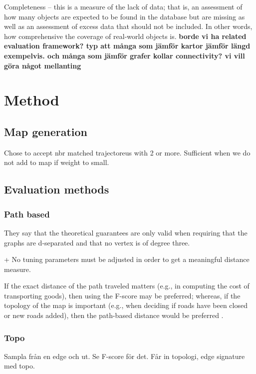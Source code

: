 Completeness – this is a measure of the lack of data; that is, an assessment of how many objects are expected to be found in the database but are missing as well as an assessment of excess data that should not be included. In other words, how comprehensive the coverage of real-world objects is. \citep{haklay}
\textbf{borde vi ha related evaluation framework? typ att många som jämför kartor jämför längd exempelvis. och många som jämför grafer kollar connectivity? vi vill göra något mellanting}



\section{Method}

\subsection{Map generation}

Chose to accept nbr matched trajectoreus with 2 or more. Sufficient when we do not add to map if weight to small. 


\subsection{Evaluation methods}

\subsubsection{Path based}

They say that the theoretical guarantees are only valid when requiring that the graphs are d-separated and that no vertex is of degree three. 

+ No tuning parameters must be adjusted in order to get a meaningful distance measure.

If the exact distance of the path traveled matters (e.g., in computing the cost of transporting goods), then using the F-score may be preferred; whereas, if the topology of the map is important (e.g., when deciding if roads have been closed or new roads added), then the path-based distance would be preferred \citep{pathbased}.


\subsubsection{Topo}
Sampla från en edge och ut. Se F-score för det. Får in topologi, edge signature med topo.


